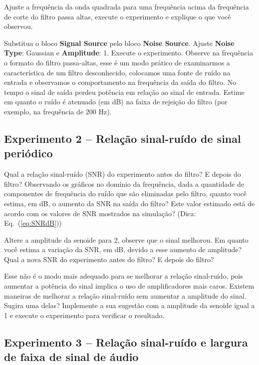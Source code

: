 \documentclass[12pt,addpoints]{exam}
\begin{document}
\begin{questions}
    \question Ajuste a frequência da onda quadrada para uma frequência acima da frequência de corte do filtro passa altas, execute o experimento e explique o que você observou.
    \fillwithlines{0.5in}
    
    \question Substitua o bloco \textbf{Signal Source} pelo bloco \textbf{Noise Source}. Ajuste \textbf{Noise Type}: Gaussian e \textbf{Amplitude}: 1. Execute o experimento. Observe na frequência o formato do filtro passa-altas, esse é um modo prático de examinarmos a característica de um filtro desconhecido, colocamos uma fonte de ruído na entrada e observamos o comportamento na frequência da saída do filtro. No tempo o sinal de saída perdeu potência em relação ao sinal de entrada. Estime em quanto o ruído é atenuado (em dB) na faixa de rejeição do filtro (por exemplo, na frequência de 200 Hz).
    \fillwithlines{0.5in}
\end{questions}

\subsection*{Experimento 2 -- Relação sinal-ruído de sinal periódico}

\begin{questions}
    \question Qual a relação sinal-ruído (SNR) do experimento antes do filtro? E depois do filtro? Observando os gráficos no domínio da frequência, dada a quantidade de componentes de frequência do ruído que são eliminadas pelo filtro, quanto você estima, em dB, o aumento da SNR na saída do filtro? Este valor estimado está de acordo com os valores de SNR mostrados na simulação? (Dica: Eq.~(\ref{eq:SNRdB}))
    \fillwithlines{0.75in}
    
    \question Altere a amplitude da senoide para 2, observe que o sinal melhorou. Em quanto você estima a variação da SNR, em dB, devido a esse aumento de amplitude? Qual a nova SNR do experimento antes do filtro? E depois do filtro?
    \fillwithlines{0.5in}
    
    \question Esse não é o modo mais adequado para se melhorar a relação sinal-ruído, pois aumentar a potência do sinal implica o uso de amplificadores mais caros. Existem maneiras de melhorar a relação sinal-ruído sem aumentar a amplitude do sinal. Sugira uma delas? Implemente a sua sugestão com a amplitude da senoide igual a 1 e execute o experimento para verificar o resultado.
    \fillwithlines{0.5in}
\end{questions}

\subsection*{Experimento 3 -- Relação sinal-ruído e largura de faixa de sinal de áudio}
\end{document}
